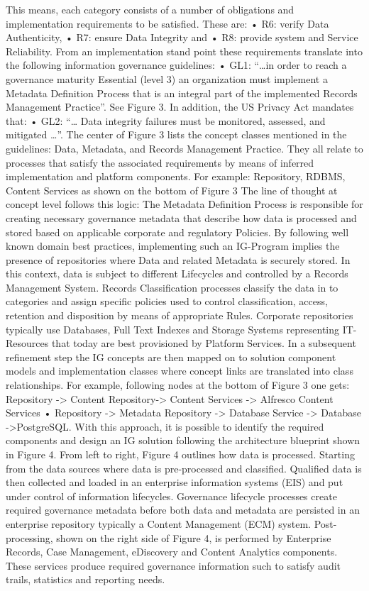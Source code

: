 %
 This means, each category consists of a number of obligations and implementation requirements to be satisfied. These are: 
•	R6: verify Data Authenticity, 
•	R7: ensure Data Integrity and 
•	R8: provide system and Service Reliability. 
From an implementation stand point these requirements translate into the following information governance guidelines:
 •	GL1: “…in order to reach a governance maturity Essential (level 3) an organization must implement a Metadata Definition Process that is an integral part of the implemented Records Management Practice”. See Figure 3.
 In addition, the US Privacy Act mandates that:
 •	GL2: “… Data integrity failures must be monitored, assessed, and mitigated …”.  
The center of Figure 3 lists the concept classes mentioned in the guidelines: Data, Metadata, and Records Management Practice. They all relate to processes that satisfy the associated requirements by means of inferred implementation and platform components. For example: Repository, RDBMS, Content Services as shown on the bottom of  Figure 3 
%
The line of thought at concept level follows this logic: The Metadata Definition Process is responsible for creating necessary governance metadata that describe how data is processed and stored based on applicable corporate and regulatory Policies. 
By following well known domain best practices, implementing such an IG-Program implies the presence of repositories where Data and related Metadata is securely stored. In this context, data is subject to different Lifecycles and controlled by a Records Management System. 
Records Classification processes classify the data in to categories and assign specific policies used to control classification, access, retention and disposition by means of appropriate Rules. 
Corporate repositories typically use Databases, Full Text Indexes and Storage Systems representing IT-Resources that today are best provisioned by Platform Services. 
 In a subsequent refinement step the IG concepts are then mapped on to solution component models and implementation classes where concept links are translated into class relationships. For example, following nodes at the bottom of Figure 3 one gets: 
Repository -> Content Repository-> Content Services -> Alfresco Content Services  •	Repository -> Metadata Repository -> Database Service -> Database ->PostgreSQL. 
With this approach, it is possible to identify the required components and design an IG solution following the architecture blueprint shown in Figure 4. From left to right, Figure 4 outlines how data is processed. Starting from the data sources where data is pre-processed and classified. Qualified data is then collected and loaded in an enterprise information systems (EIS) and put under control of information lifecycles. Governance lifecycle processes create required governance metadata before both data and metadata are persisted in an enterprise repository typically a Content Management (ECM) system. Post-processing, shown on the right side of Figure 4, is performed by Enterprise Records, Case Management, eDiscovery and Content Analytics components.  These services produce required governance information such to satisfy audit trails, statistics and reporting needs. 
